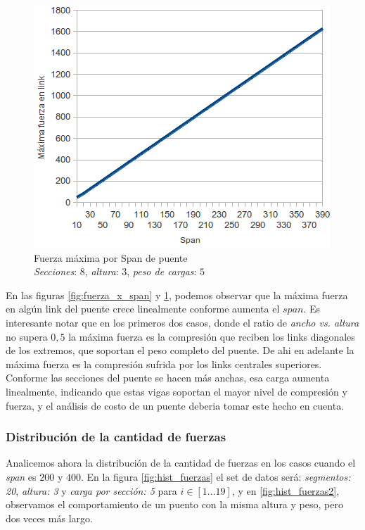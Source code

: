 \begin{figure}[h!]
	\begin{center}
	\includegraphics[scale=0.8]{archivos/graficos/Fuerza-x-span2.png}
	\caption{\label{fig:fuerza_x_span2}Fuerza máxima por Span de puente\\  		\textit{Secciones}: $8$, \textit{altura}: $3$, \textit{peso de cargas}: $5$}
	\end{center}
\end{figure}

En las figuras \ref{fig:fuerza_x_span} y \ref{fig:fuerza_x_span2}, podemos observar que la máxima fuerza en algún link del puente crece linealmente conforme aumenta el $span$. Es interesante notar que en los primeros dos casos, donde el ratio de \textit{ancho vs. altura} no supera $0,5$ la máxima fuerza es la compresión que reciben los links diagonales de los extremos, que soportan el peso completo del puente. De ahi en adelante la máxima fuerza es la compresión sufrida por los links centrales superiores.\\

Conforme las secciones del puente se hacen más anchas, esa carga aumenta linealmente, indicando que estas vigas soportan el mayor nivel de compresión y fuerza, y el análisis de costo de un puente deberia tomar este hecho en cuenta.\\

\subsubsection{Distribución de la cantidad de fuerzas}

Analicemos ahora la distribución de la cantidad de fuerzas en los casos cuando el \textit{span} es $200$ y $400$. En la figura \ref{fig:hist_fuerzas} el set de datos será: \textit{segmentos: 20}, \textit{altura: 3} y \textit{carga por sección: 5} para $i \in [1 \dots 19]$, y en \ref{fig:hist_fuerzas2}, observamos el comportamiento de un puento con la misma altura y peso, pero dos veces más largo.

